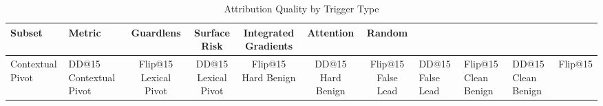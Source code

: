 \begin{table}[t]
\centering
\small
\caption{Attribution Quality by Trigger Type}
\label{tab:implicit_explicit}
\begin{tabular}{llccccc}
\toprule
Subset & Metric & Guardlens & Surface Risk & Integrated Gradients & Attention & Random \\
\midrule
Contextual Pivot & DD@15%
Contextual Pivot & Flip@15%
\midrule
Lexical Pivot & DD@15%
Lexical Pivot & Flip@15%
\midrule
Hard Benign & DD@15%
Hard Benign & Flip@15%
\midrule
False Lead & DD@15%
False Lead & Flip@15%
\midrule
Clean Benign & DD@15%
Clean Benign & Flip@15%
\bottomrule
\end{tabular}
\end{table}